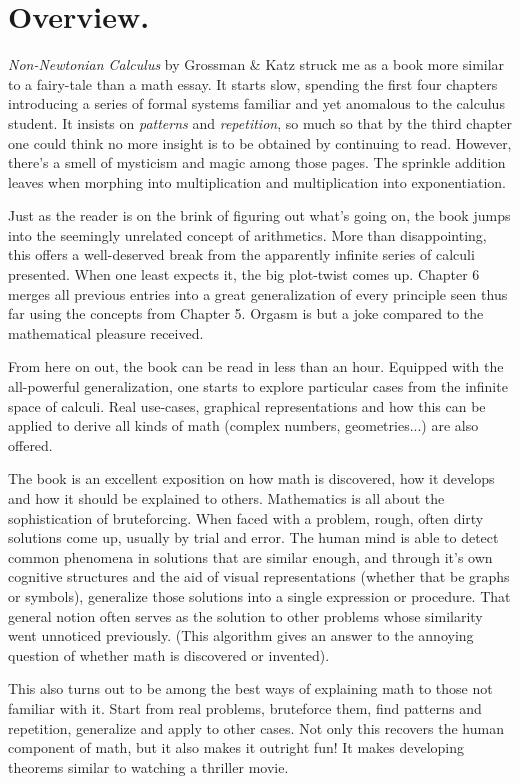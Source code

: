 \section{Overview.}

\textit{Non-Newtonian Calculus} by Grossman \& Katz struck me as a book more similar to a fairy-tale than a math essay. It starts slow, spending the first four chapters introducing a series of formal systems familiar and yet anomalous to the calculus student. It insists on \textit{patterns} and \textit{repetition}, so much so that by the third chapter one could think no more insight is to be obtained by continuing to read. However, there's a smell of mysticism and magic among those pages. The sprinkle addition leaves when morphing into multiplication and multiplication into exponentiation.

Just as the reader is on the brink of figuring out what's going on, the book jumps into the seemingly unrelated concept of arithmetics. More than disappointing, this offers a well-deserved break from the apparently infinite series of calculi presented. When one least expects it, the big plot-twist comes up. Chapter 6 merges all previous entries into a great generalization of every principle seen thus far using the concepts from Chapter 5. Orgasm is but a joke compared to the mathematical pleasure received.

From here on out, the book can be read in less than an hour. Equipped with the all-powerful generalization, one starts to explore particular cases from the infinite space of calculi. Real use-cases, graphical representations and how this can be applied to derive all kinds of math (complex numbers, geometries...) are also offered.

The book is an excellent exposition on how math is discovered, how it develops and how it should be explained to others. Mathematics is all about the sophistication of bruteforcing. When faced with a problem, rough, often dirty solutions come up, usually by trial and error. The human mind is able to detect common phenomena in solutions that are similar enough, and through it's own cognitive structures and the aid of visual representations (whether that be graphs or symbols), generalize those solutions into a single expression or procedure. That general notion often serves as the solution to other problems whose similarity went unnoticed previously. (This algorithm gives an answer to the annoying question of whether math is discovered or invented).

This also turns out to be among the best ways of explaining math to those not familiar with it. Start from real problems, bruteforce them, find patterns and repetition, generalize and apply to other cases. Not only this recovers the human component of math, but it also makes it outright fun! It makes developing theorems similar to watching a thriller movie.

